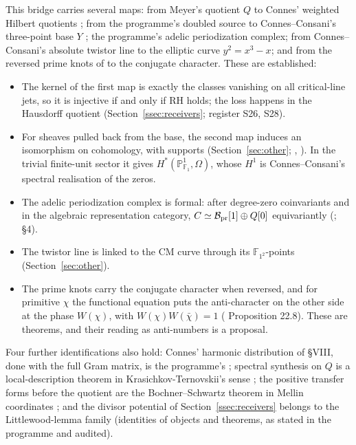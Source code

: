 This bridge carries several maps: from Meyer's quotient $Q$ \cite{Meyer} to Connes' weighted Hilbert quotients \cite{Connes}; from the programme's doubled source to Connes--Consani's three-point base $Y$ \cite[§5]{CCP1}; the programme's adelic periodization complex; from Connes--Consani's absolute twistor line \cite{CCtwistor} to the elliptic curve $y^2=x^3-x$; and from the reversed prime knots of \cite{CCknots} to the conjugate character.
These are established:
\begin{itemize}
\item The kernel of the first map is exactly the classes vanishing on all critical-line jets, so it is injective if and only if RH holds; the loss happens in the Hausdorff quotient (Section~\ref{ssec:receivers}; register S26, S28).
\item For sheaves pulled back from the base, the second map induces an isomorphism on cohomology, with supports (Section~\ref{sec:other}; , ). In the trivial finite-unit sector it gives $H^*(\mathbb{P}^1_{\mathbb{F}_1},\Omega)$, whose $H^1$ is Connes--Consani's spectral realisation of the zeros.
\item The adelic periodization complex is formal: after degree-zero coinvariants and in the algebraic representation category, $C\simeq\mathcal{B}_{\mathrm{pr}}[1]\oplus Q[0]$ equivariantly (;  §4).
\item The twistor line is linked to the CM curve through its $\mathbb{F}_{1^2}$-points (Section~\ref{sec:other}).
\item The prime knots carry the conjugate character when reversed, and for primitive $\chi$ the functional equation puts the anti-character on the other side at the phase $W(\chi)$, with $W(\chi)W(\bar\chi)=1$ ( Proposition 22.8). These are theorems, and their reading as anti-numbers is a proposal.
\end{itemize}
Four further identifications also hold: Connes' harmonic distribution of §VIII, done with the full Gram matrix, is the programme's ; spectral synthesis on $Q$ is a local-description theorem in Krasichkov-Ternovskii's sense \cite{Krasichkov}; the positive transfer forms before the quotient are the Bochner--Schwartz theorem in Mellin coordinates \cite{Vladimirov}; and the divisor potential of Section~\ref{ssec:receivers} belongs to the Littlewood-lemma family \cite{BalazardSaiasYor,SekatskiiBeltraminelliMerlini} (identities of objects and theorems, as stated in the programme and audited).

